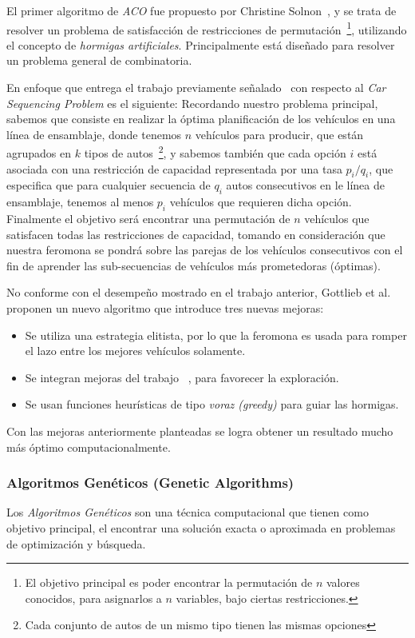 El primer algoritmo de \emph{ACO} fue propuesto por Christine Solnon~\cite{Sol00},
y se trata de resolver un problema de satisfacción de restricciones de permutación~\footnote{
El objetivo principal es poder encontrar la permutación de $n$ valores conocidos,
para asignarlos a $n$ variables, bajo ciertas restricciones.
},
utilizando el concepto de \emph{hormigas artificiales}. Principalmente está diseñado
para resolver un problema general de combinatoria.

En enfoque que entrega el trabajo previamente señalado~\cite{Sol00} con respecto
al \emph{Car Sequencing Problem} es el siguiente:
Recordando nuestro problema principal, sabemos que consiste
en realizar la óptima planificación de los vehículos en una línea de ensamblaje,
donde tenemos $n$ vehículos para producir, que están agrupados en $k$ tipos
de autos~\footnote{
Cada conjunto de autos de un mismo tipo tienen las mismas opciones
}, y sabemos también que cada opción $i$ está asociada con una restricción de capacidad
representada por una tasa $p_i/q_i$, que especifica que para cualquier secuencia
de $q_i$ autos consecutivos en le línea de ensamblaje, tenemos al menos $p_i$ vehículos
que requieren dicha opción.
Finalmente el objetivo será encontrar una permutación de $n$ vehículos que satisfacen
todas las restricciones de capacidad, tomando en consideración que nuestra feromona
se pondrá sobre las parejas de los vehículos consecutivos con el fin de aprender
las sub-secuencias de vehículos más prometedoras (óptimas).

No conforme con el desempeño mostrado en el trabajo anterior, Gottlieb et al.~\cite{GPS03}
proponen un nuevo algoritmo que introduce tres nuevas mejoras:
\begin{itemize}
	\item Se utiliza una estrategia elitista, por lo que la feromona es usada para romper el lazo entre los mejores vehículos solamente.
	\item Se integran mejoras del trabajo ~\cite{Stu}, para favorecer la exploración.
	\item Se usan funciones heurísticas de tipo \emph{voraz (greedy)} para guiar las hormigas.
\end{itemize}
Con las mejoras anteriormente planteadas se logra obtener un resultado mucho más óptimo computacionalmente.

\subsubsection{Algoritmos Genéticos (Genetic Algorithms)}
Los \emph{Algoritmos Genéticos} son una técnica computacional que tienen como objetivo principal,
el encontrar una solución exacta o aproximada en problemas de optimización y búsqueda.


